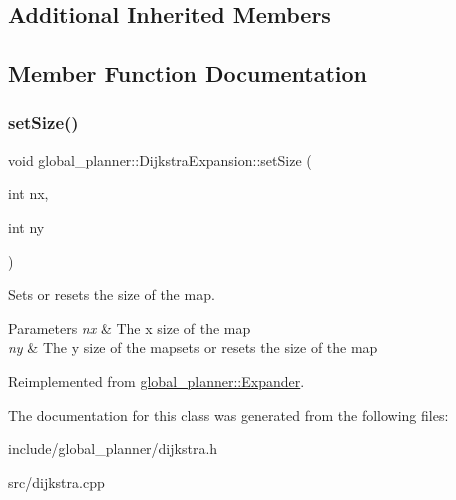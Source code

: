 \subsection*{Additional Inherited Members}


\subsection{Member Function Documentation}
\mbox{\label{classglobal__planner_1_1_dijkstra_expansion_a7d286126b2c478fc55c5e995e1deff29}} 
\subsubsection{\texorpdfstring{set\+Size()}{setSize()}}
{\footnotesize\ttfamily void global\+\_\+planner\+::\+Dijkstra\+Expansion\+::set\+Size (\begin{DoxyParamCaption}\item[{int}]{nx,  }\item[{int}]{ny }\end{DoxyParamCaption})\hspace{0.3cm}{\ttfamily [virtual]}}



Sets or resets the size of the map. 


\begin{DoxyParams}{Parameters}
{\em nx} & The x size of the map \\
\hline
{\em ny} & The y size of the mapsets or resets the size of the map \\
\hline
\end{DoxyParams}


Reimplemented from \mbox{\hyperlink{classglobal__planner_1_1_expander_aeeaa60103de1ee71a1969e40a3735094}{global\+\_\+planner\+::\+Expander}}.



The documentation for this class was generated from the following files\+:\begin{DoxyCompactItemize}
\item 
include/global\+\_\+planner/dijkstra.\+h\item 
src/dijkstra.\+cpp\end{DoxyCompactItemize}
